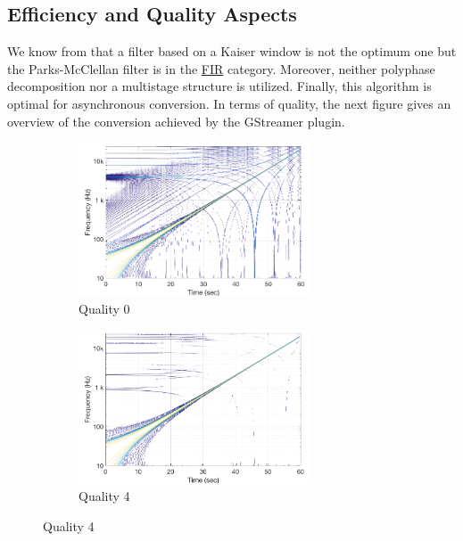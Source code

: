 \subsection{Efficiency and Quality Aspects}
We know from \cite{comparison_filters} that a filter based on a Kaiser window is not the optimum one but the Parks-McClellan filter is in the \hyperlink{FIR}{FIR} category. Moreover, neither polyphase decomposition nor a multistage structure is utilized. Finally, this algorithm is optimal for asynchronous conversion. In terms of quality, the next figure gives an overview of the conversion achieved by the GStreamer plugin.

\begin{figure}[ht]
	\hspace*{0.5cm}
	\begin{subfigure}[b]{0.5\textwidth}
	
		\includegraphics[height = 0.65\textwidth, width = 0.75\textwidth]{gstreamer_q0.png}
		\caption{Quality 0}
	\end{subfigure}
	\hspace*{0.25cm}
	\begin{subfigure}[b]{0.5\textwidth}
	
		\includegraphics[height = 0.65\textwidth, width = 0.75\textwidth]{gstreamer_q4.png}
		\caption{Quality 4}
	\end{subfigure}
\end{figure}

